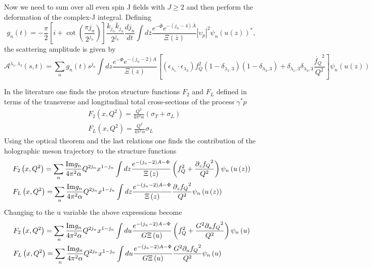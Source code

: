 \documentclass[a4paper,12pt]{article}
\begin{document}
Now we need to sum over all even spin J fields with $J \geqslant 2$ and then perform the deformation of the complex-J integral.
Defining
\begin{equation}
g_n\left(t\right) = - \frac{\pi}{2} \left[i + \cot\left(\frac{\pi j_n}{2^{j_n}}\right)\right] \frac{k_{j_n} \bar{k}_{j_n}}{2^{j_n}} \frac{d j_n}{dt} \int d\bar{z} \frac{e^{-\bar{\Phi}}e^{-\left(j_n-4\right)\bar{A}}}{\Xi\left(\bar{z}\right)} |\upsilon_p|^2  {\psi_n\left(u\left(z\right)\right)}^*,
\end{equation}
the scattering amplitude is given by
\begin{equation}
\mathcal{A}^{\lambda_1, \lambda_3} \left(s, t\right) = \sum_n g_n\left(t\right) s^{j_n} \int dz \frac{e^{-\Phi} e^{-\left(j_n-2\right)A}}{\Xi\left(z\right)} \left[ \left( \epsilon_{\lambda_1} \cdot \epsilon_{\lambda_3}\right) f_Q^2 \left(1-\delta_{\lambda_1,3}\right) \left(1-\delta_{\lambda_3,3}\right) + \delta_{\lambda_1,3} \delta_{\lambda_3, 3} \frac{\dot{f_Q}^2}{Q^2}\right] \psi_n \left(u\left(z\right)\right)
\end{equation}

In the literature one finds the proton structure functions $F_2$ and $F_L$ defined in terms of the transverse and longitudinal total cross-sections of the process $\gamma^{*} p$
\begin{align}
&F_2\left(x, Q^2\right) = \frac{Q^2}{4 \pi^2 \alpha} \left(\sigma_T + \sigma_L\right) \\
&F_L\left(x, Q^2\right) = \frac{Q^2}{4 \pi^2 \alpha} \sigma_L
\end{align}
Using the optical theorem and the last relations one finds the contribution of the holographic meson trajectory to the structure functions 
\begin{align}
&F_2\left(x, Q^2\right) = \sum_n \frac{{\rm Im} g_n }{4\pi^2 \alpha} Q^{2 j_n} x^{1-j_n} \int dz \frac{e^{-\left(j_n - 2 \right)A - \Phi}}{\Xi\left(z\right)} \left(f_Q^2 +\frac{\partial_z{f_Q}^2}{Q^2} \right) \psi_n\left(u\left(z\right)\right)\\
&F_L\left(x, Q^2\right) = \sum_n \frac{{\rm Im} g_n }{4\pi^2 \alpha} Q^{2 j_n} x^{1-j_n} \int dz \frac{e^{-\left(j_n - 2 \right)A - \Phi}}{\Xi\left(z\right)} \frac{\partial_z{f_Q}^2}{Q^2} \psi_n\left(u\left(z\right)\right)
\end{align}
Changing to the u variable the above expressions become
\begin{align}
&F_2\left(x, Q^2\right) = \sum_n \frac{{\rm Im} g_n }{4\pi^2 \alpha} Q^{2 j_n} x^{1-j_n} \int du \frac{e^{-\left(j_n - 2 \right)A - \Phi}}{G\Xi\left(u\right)} \left(f_Q^2 +\frac{G^2\partial_u{f_Q}^2}{Q^2} \right) \psi_n\left(u\right)\\
&F_L\left(x, Q^2\right) = \sum_n \frac{{\rm Im} g_n }{4\pi^2 \alpha} Q^{2 j_n} x^{1-j_n} \int du \frac{e^{-\left(j_n - 2 \right)A - \Phi}}{G\Xi\left(u\right)} \frac{G^2\partial_u{f_Q}^2}{Q^2} \psi_n\left(u\right)
\end{align}
\end{document}
